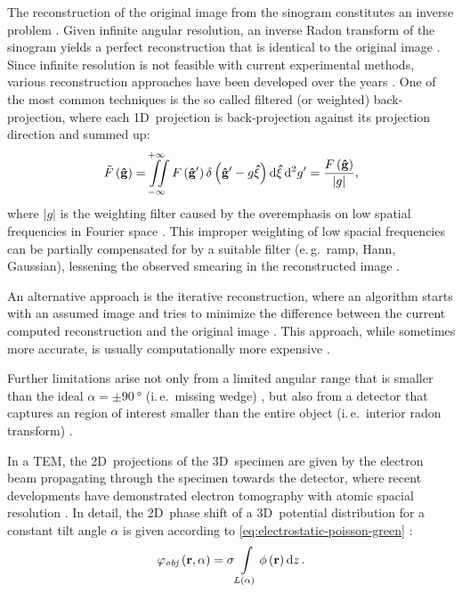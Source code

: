 The reconstruction of the original image from the sinogram constitutes an inverse problem \cite{Ramm1996,Herman2009,Kuchment2014}. Given infinite angular resolution, an inverse Radon transform of the sinogram yields a perfect reconstruction that is identical to the original image \cite{Ramm1996,Herman2009,Kuchment2014}. Since infinite resolution is not feasible with current experimental methods, various reconstruction approaches have been developed over the years \cite{Ramm1996,Herman2009,Kuchment2014}. One of the most common techniques is the so called filtered (or weighted) back-projection, where each 1D~projection is back-projection against its projection direction and summed up:
\begin{equation}
  \tilde{F}\left(\vb{\hat{g}}\right) = \iint \limits_{-\infty}^{+\infty} F\left(\vb{\hat{g}'}\right) \delta \left(\vb{\hat{g}'} - g \vb{\hat{\xi}}\right) \dd{\vb{\hat{\xi}}} \dd[2]{g'} = \frac{F\left(\vb{\hat{g}}\right)}{\lvert g \rvert},
\end{equation}
where $\lvert g \rvert$ is the weighting filter caused by the overemphasis on low spatial frequencies in Fourier space \cite{Ramm1996,Herman2009,Kuchment2014}. This improper weighting of low spacial frequencies can be partially compensated for by a suitable filter (e.\,g.\ ramp, Hann, Gaussian), lessening the observed smearing in the reconstructed image \cite{Ramm1996,Herman2009,Kuchment2014}.

An alternative approach is the iterative reconstruction, where an algorithm starts with an assumed image and tries to minimize the difference between the current computed reconstruction and the original image \cite{Ramm1996,Herman2009,Kuchment2014}. This approach, while sometimes more accurate, is usually computationally more expensive \cite{Ramm1996,Herman2009,Kuchment2014}.

Further limitations arise not only from a limited angular range that is smaller than the ideal $\alpha = \pm \SI{90}{\degree}$ (i.\,e.\ missing wedge) \cite{Ramm1996,Herman2009,Kuchment2014}, but also from a detector that captures an region of interest smaller than the entire object (i.\,e.\ interior radon transform) \cite{Maass1992,Pan2005,DaSilva2018}.

In a TEM, the 2D~projections of the 3D~specimen are given by the electron beam propagating through the specimen towards the detector, where recent developments have demonstrated electron tomography with atomic spacial resolution \cite{Scott2012,Miao2016,Yang2017}. In detail, the 2D~phase shift of a 3D~potential distribution for a constant tilt angle $\alpha$ is given according to \cref{eq:electrostatic-poisson-green} \cite{Wolf2014,Lubk2014}:
\begin{equation}
  \varphi_{\mathit{obj}}\left(\vb{r}, \alpha \right) = \sigma \int\limits_{L\left(\alpha\right)} \phi\left(\vb{r}\right) \dd{z}.
\end{equation}
